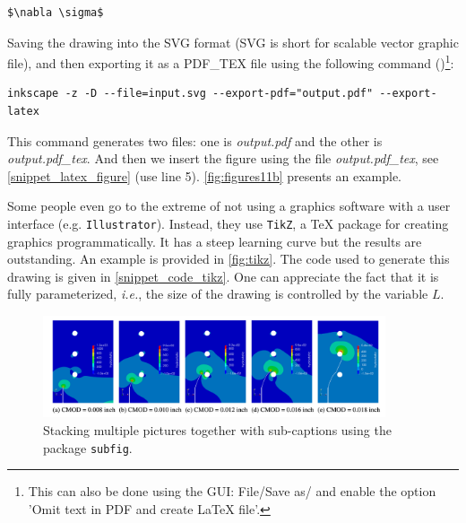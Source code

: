 \documentclass[authoryear,12pta4paper,fleqn]{article}
\newcommand{\ie}{\textit{i.e.},\xspace}
\numberwithin{equation}{section}
\theoremstyle{remark}
\begin{document}
\begin{verbatim}
$\nabla \sigma$
\end{verbatim}

Saving the drawing into the SVG format (SVG is short for scalable vector graphic file), and then exporting it as a PDF\_TEX file using the following command (\cite{inkscape})\footnote{This can also be done using the GUI: File/Save as/ and enable the option 'Omit text in PDF and create LaTeX file'.}:
\begin{verbatim}
inkscape -z -D --file=input.svg --export-pdf="output.pdf" --export-latex
\end{verbatim}
This command generates two files: one is \textit{output.pdf} and the other is \textit{output.pdf\_tex}. And 
then we insert the figure using the file \textit{output.pdf\_tex}, see \cref{snippet_latex_figure} (use line 5). \cref{fig:figures11b} presents an example.

Some people even go to the extreme of not using a graphics software with a user interface (e.g. \texttt{Illustrator}). Instead, they use  \texttt{TikZ}, a TeX package for creating graphics programmatically. It has a steep learning curve but the results are outstanding. An example is provided in \cref{fig:tikz}. The code used to generate this drawing is given in \cref{snippet_code_tikz}. One can appreciate the fact that it is fully parameterized, \ie the size of the drawing is controlled by the variable $L$.




\begin{figure}[!h]
  \centering
\includegraphics[width=0.9\textwidth]{figures1}
  \caption{Stacking multiple pictures together with sub-captions using the package \texttt{subfig}.}
  \label{fig:figures1}
\end{figure}
\end{document}
